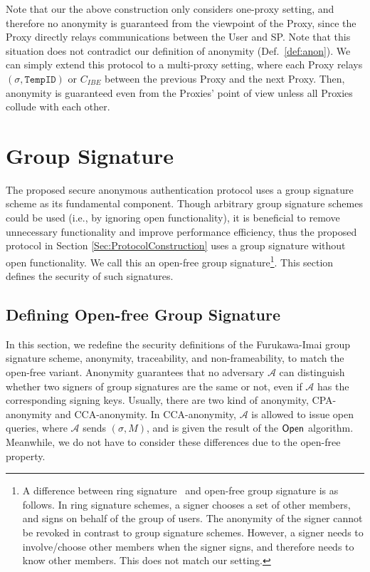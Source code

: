 \documentclass[preprint]{sig-alternate}
\begin{document}
Note that our the above construction only considers one-proxy setting, 
and therefore no anonymity is guaranteed from the viewpoint of the Proxy, 
since the Proxy directly relays communications between the User and SP. 
Note that this situation does not contradict our definition of anonymity (Def.~\ref{def:anon}). 
We can simply extend this protocol to a multi-proxy setting, where each Proxy relays $(\sigma, \mathtt{TempID})$ or $C_{IBE}$ between the previous Proxy and the next Proxy. Then, anonymity is guaranteed even from the Proxies' point of view unless all Proxies collude with each other. 


\section{Group Signature}

The proposed secure anonymous authentication protocol uses a group signature scheme as its fundamental component. 
Though arbitrary group signature schemes could be used (i.e., by ignoring open functionality), it is beneficial to remove unnecessary functionality and improve performance efficiency, thus the proposed protocol in Section \ref{Sec:ProtocolConstruction} uses a group signature without open functionality. We call this an open-free group signature\footnote{A difference between ring signature~\cite{[RivestST01]} and open-free group signature is as follows. In ring signature schemes, a signer chooses a set of other members, and signs on behalf of the group of users. The anonymity of the signer cannot be revoked in contrast to group signature schemes. However, a signer needs to involve/choose other members when the signer signs, and therefore needs to know other members. This does not match our setting. }. 
This section defines the security of such signatures. 

\subsection{Defining Open-free Group Signature}\label{GS}

In this section, 
we redefine the security definitions of the Furukawa-Imai group signature scheme, anonymity, traceability, and non-frameability, to match the open-free variant. 
Anonymity guarantees that no adversary $\mathcal{A}$ can distinguish whether two signers of group signatures are the same or not, even if $\mathcal{A}$ has the corresponding signing keys. 
Usually, there are two kind of anonymity, CPA-anonymity and CCA-anonymity. 
In CCA-anonymity, $\mathcal{A}$ is allowed to issue open queries, where $\mathcal{A}$ sends $(\sigma,M)$, and is given the result of the ${\sf Open}$ algorithm. 
Meanwhile, we do not have to consider these differences due to the open-free property. 
\end{document}
